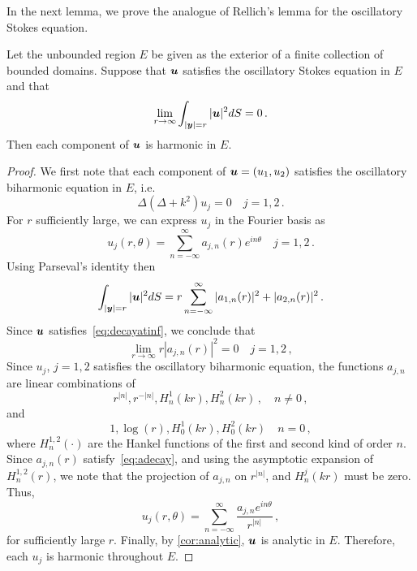 In the next lemma, we prove the analogue of Rellich's lemma for the
oscillatory Stokes equation. 
\begin{lem}
  \label{lem:rellich}
    Let the unbounded region $E$ be given as the exterior
  of a finite collection of bounded domains.
  Suppose that ${\boldsymbol u}$ satisfies the oscillatory Stokes equation in
  $E$ and that 
\begin{equation}
\lim_{r \to \infty} \int_{|{\boldsymbol y}|=r} |{\boldsymbol u}|^2 dS = 0 
\, . \label{eq:decayatinf}
\end{equation}
Then each component of ${\boldsymbol u}$ is harmonic in $E$.
\end{lem}
\begin{proof}
We first note that each component of ${\boldsymbol u}= (u_{1},u_{2})$ satisfies the 
oscillatory biharmonic equation in $E$, i.e.
\begin{equation}
\Delta (\Delta + k^2) u_{j} = 0 \quad j=1,2 \,. \nonumber
\end{equation}
For $r$ sufficiently large, we can express $u_{j}$ in the Fourier basis as
\begin{equation}
u_{j}(r,\theta) = \sum_{n=-\infty}^{\infty} a_{j,n}(r) e^{i n \theta}  \quad 
j=1,2 \, . \nonumber
\end{equation}
Using Parseval's identity then
\begin{equation}
\int_{|{\boldsymbol y}|=r} |{\boldsymbol u}|^2 dS = r\sum_{n=-\infty}^{\infty} |a_{1,n}(r)|^2  +
|a_{2,n}(r)|^2 \, . \nonumber
\end{equation}
Since ${\boldsymbol u}$ satisfies~\cref{eq:decayatinf}, we conclude that
\begin{equation}
\lim_{r\to\infty} r|a_{j,n}(r)|^2 = 0 \quad j=1,2 \, , \label{eq:adecay}
\end{equation}
Since $u_{j}$, $j=1,2$ satisfies the oscillatory biharmonic equation,
the functions $a_{j,n}$ are linear combinations of 
\begin{equation}
r^{|n|}, r^{-|n|}, H^{1}_{n}(k r), H^{2}_{n}(k r) \, , \quad
n\neq 0 \, , \nonumber
\end{equation}
and
\begin{equation}
1, \log{(r)}, H^{1}_{0}(k r), H^{2}_{0}(k r) \quad n=0 \, ,  \nonumber
\end{equation} 
where $H_{n}^{1,2}(\cdot)$ are the Hankel functions of the first and
second kind of order $n$.
Since $a_{j,n}(r)$ satisfy~\cref{eq:adecay}, and using the asymptotic 
expansion of $H_{n}^{1,2}(r)$, we note that the projection of 
$a_{j,n}$ on $r^{|n|}$, and $H_{n}^{j}(k r)$ must be zero. 
Thus, 
\begin{equation}
u_{j}(r,\theta) = \sum_{n=-\infty}^{\infty} \frac{a_{j,n} e^{i n \theta}}{r^{|n|}} 
\, , \nonumber
\end{equation}
for sufficiently large $r$.
Finally, by \cref{cor:analytic}, ${\boldsymbol u}$ is
analytic in $E$. Therefore, each $u_j$ is harmonic
throughout $E$.
\end{proof}
